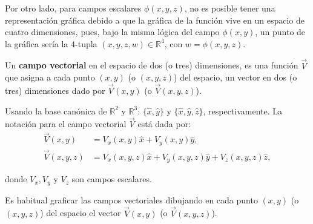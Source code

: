 Por otro lado, para campos escalares $\phi(x,y,z)$, no es posible tener una representación gráfica debido a que la gráfica de la función vive en un espacio de  cuatro dimensiones, pues, bajo la misma lógica del campo $\phi(x,y)$, un punto de la gráfica sería la $4$-tupla $(x,y,z,w) \in \mathbb{R}^4$, con $w = \phi(x,y,z)$. 

 
Un \textbf{campo vectorial} en el espacio de dos (o tres) dimensiones, es una función $\vec{V}$ que asigna a cada punto $(x,y)$ (o $(x,y,z)$) del espacio, un vector en dos (o tres) dimensiones dado por $\vec{V}(x,y)$ (o $\vec{V}(x,y,z)$).

Usando la base canónica de $\mathbb{R}^2$ y $\mathbb{R}^3$: $\{\hat{x},\hat{y}\}$ y $\{\hat{x},\hat{y}, \hat{z}\}$,  respectivamente. La notación para el campo vectorial $\vec{V}$ está dada por:
\begin{align*}
    \vec{V} (x,y) &= V_x(x,y) \hat{x} + V_y(x,y) \hat{y}, \\
    \vec{V}(x,y,z) &= V_x(x,y,z) \hat{x} + V_y(x,y,z) \hat{y} + V_z(x,y,z) \hat{z},   
\end{align*}

donde $V_x, V_y$ y $V_z$ son campos escalares.

Es habitual graficar las campos vectoriales dibujando en cada punto $(x,y)$ (o $(x,y,z)$) del espacio el vector $\Vec{V}(x,y)$ (o $\Vec{V}(x,y,z)$).

